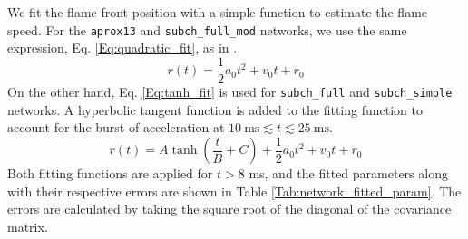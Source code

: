 \documentclass[preprint,times,tighten,linenumbers,trackchanges]{aastex631}
\begin{document}
We fit the flame front position with a simple function to estimate
the flame speed.  For the {\tt aprox13} and {\tt subch\_full\_mod} networks, we use the same expression, Eq. \ref{Eq:quadratic_fit}, 
as in \citet{harpole:2021}.
\begin{equation}\label{Eq:quadratic_fit}
    r(t) = \frac{1}{2}a_0 t^2 + v_0 t + r_0
\end{equation}
On the other hand, Eq. \ref{Eq:tanh_fit} is used for {\tt subch\_full} and {\tt subch\_simple} networks. A hyperbolic tangent function is added to the fitting function to account for the burst of acceleration at $10 \ \mbox{ms} \lesssim t \lesssim 25 \ \mbox{ms}$.
\begin{equation}\label{Eq:tanh_fit}
    r(t) = A\tanh{\left(\frac{t}{B} + C\right)} + \frac{1}{2}a_0 t^2 + v_0 t + r_0
\end{equation}
Both fitting functions are applied for $t > 8$ ms, and the fitted parameters along with their respective errors are shown in Table \ref{Tab:network_fitted_param}. The errors are calculated by taking the square root of the diagonal of the covariance matrix. 
\end{document}
